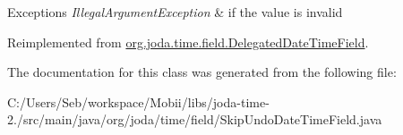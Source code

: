 \begin{DoxyExceptions}{Exceptions}
{\em Illegal\-Argument\-Exception} & if the value is invalid \\
\hline
\end{DoxyExceptions}


Reimplemented from \hyperlink{classorg_1_1joda_1_1time_1_1field_1_1_delegated_date_time_field_ac8c71ae2bf565cc8ebcf71ddd4b4053f}{org.\-joda.\-time.\-field.\-Delegated\-Date\-Time\-Field}.



The documentation for this class was generated from the following file\-:\begin{DoxyCompactItemize}
\item 
C\-:/\-Users/\-Seb/workspace/\-Mobii/libs/joda-\/time-\/2./src/main/java/org/joda/time/field/Skip\-Undo\-Date\-Time\-Field.\-java\end{DoxyCompactItemize}
